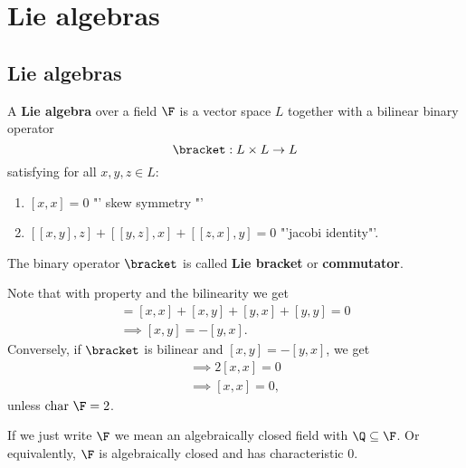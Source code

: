 \chapter{Lie algebras}
\section{Lie algebras}
\begin{definition}
    A \textbf{Lie algebra} over a field $\F$ 
    is a vector space $L$ together with a bilinear binary operator 
    $$ \bracket : L \times L \to L $$ satisfying for all $x,y,z \in L$:
    \begin{enumerate}[label=(\arabic*)]
        \item $[x,x] = 0$ "' skew symmetry "'\label{item:skew}
        \item $[[x,y],z] + [[y,z],x] + [[z,x],y] = 0$ "'jacobi identity"'.
    \end{enumerate}

    The binary operator $\bracket$ is called \textbf{Lie bracket} or \textbf{commutator}.
\end{definition}

\begin{remark}
    Note that with property  and the bilinearity we get
    \begin{align*}
        [(x+y),(x+y)] = [x,x] + [x,y] + [y,x] + [y,y] = 0 \\
        \implies [x,y] = -[y,x].
    \end{align*}
    Conversely, if $\bracket$ is bilinear and $[x,y] = -[y,x]$, we get
    \begin{align*}
        \implies 2 [x,x] = 0\\
        \implies [x,x] = 0,
    \end{align*}
    unless $\textrm{char } \F = 2$.
\end{remark}

\begin{notation}
    If we just write $\F$ we mean an algebraically closed field with $\Q \subseteq \F$.
    Or equivalently, $\F$ is algebraically closed and has characteristic $0$.
\end{notation}

